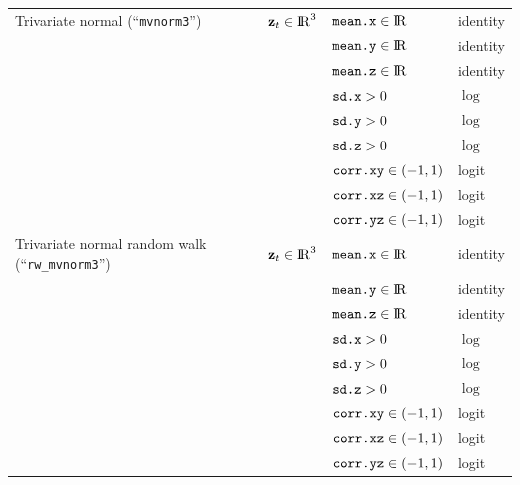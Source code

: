 \documentclass[12pt]{article}\usepackage[]{graphicx}\usepackage[]{xcolor}
\begin{document}
\begin{small}
\begin{table}
\begin{tabular}{llll}
  Trivariate normal (``\verb|mvnorm3|'')& ${\mathbf z_t}\in{\rm I\!R}^3$  & $\verb|mean.x|\in{\rm I\!R}$     &  identity \tabularnewline  
                                        &                                 & $\verb|mean.y|\in{\rm I\!R}$     &  identity \tabularnewline  
                                        &                                 & $\verb|mean.z|\in{\rm I\!R}$     &  identity \tabularnewline  
                                        &                                 & $\verb|sd.x|>0$               &  $\log$ \tabularnewline                                                
                                        &                                 & $\verb|sd.y|>0$               &  $\log$ \tabularnewline   
                                        &                                 & $\verb|sd.z|>0$               &  $\log$ \tabularnewline
                                        &                                 & $\verb|corr.xy|\in(-1,1)$   &  logit \tabularnewline
                                        &                                 & $\verb|corr.xz|\in(-1,1)$   &  logit \tabularnewline   
                                        &                                 & $\verb|corr.yz|\in(-1,1)$   &  logit \tabularnewline  
  \rowcolor{Gray} Trivariate normal random walk (``\verb|rw_mvnorm3|'') & ${\mathbf z_t}\in{\rm I\!R}^3$  & $\verb|mean.x|\in{\rm I\!R}$     &  identity \tabularnewline  
  \rowcolor{Gray}                                                       &                                 & $\verb|mean.y|\in{\rm I\!R}$     &  identity \tabularnewline  
  \rowcolor{Gray}                                                       &                                 & $\verb|mean.z|\in{\rm I\!R}$     &  identity \tabularnewline  
  \rowcolor{Gray}                                                       &                                 & $\verb|sd.x|>0$               &  $\log$ \tabularnewline        
  \rowcolor{Gray}                                                       &                                 & $\verb|sd.y|>0$               &  $\log$ \tabularnewline   
  \rowcolor{Gray}                                                       &                                 & $\verb|sd.z|>0$               &  $\log$ \tabularnewline
  \rowcolor{Gray}                                                       &                                 & $\verb|corr.xy|\in(-1,1)$   &  logit \tabularnewline
  \rowcolor{Gray}                                                       &                                 & $\verb|corr.xz|\in(-1,1)$   &  logit \tabularnewline   
  \rowcolor{Gray}                                                       &                                 & $\verb|corr.yz|\in(-1,1)$   &  logit \tabularnewline  

\end{tabular}
\end{table}
\end{small}
\end{document}
